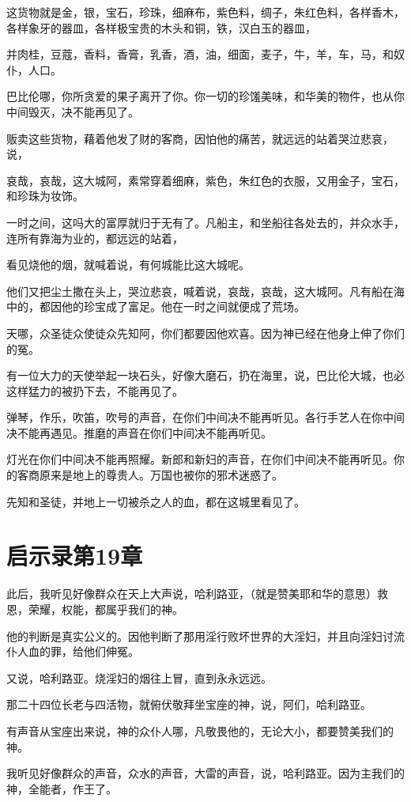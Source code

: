 \documentclass[12pt,oneside]{book}
\begin{document}
这货物就是金，银，宝石，珍珠，细麻布，紫色料，绸子，朱红色料，各样香木，各样象牙的器皿，各样极宝贵的木头和铜，铁，汉白玉的器皿，

并肉桂，豆蔻，香料，香膏，乳香，酒，油，细面，麦子，牛，羊，车，马，和奴仆，人口。

巴比伦哪，你所贪爱的果子离开了你。你一切的珍馐美味，和华美的物件，也从你中间毁灭，决不能再见了。

贩卖这些货物，藉着他发了财的客商，因怕他的痛苦，就远远的站着哭泣悲哀，说，

哀哉，哀哉，这大城阿，素常穿着细麻，紫色，朱红色的衣服，又用金子，宝石，和珍珠为妆饰。

一时之间，这吗大的富厚就归于无有了。凡船主，和坐船往各处去的，并众水手，连所有靠海为业的，都远远的站着，

看见烧他的烟，就喊着说，有何城能比这大城呢。

他们又把尘土撒在头上，哭泣悲哀，喊着说，哀哉，哀哉，这大城阿。凡有船在海中的，都因他的珍宝成了富足。他在一时之间就便成了荒场。

天哪，众圣徒众使徒众先知阿，你们都要因他欢喜。因为神已经在他身上伸了你们的冤。

有一位大力的天使举起一块石头，好像大磨石，扔在海里，说，巴比伦大城，也必这样猛力的被扔下去，不能再见了。

弹琴，作乐，吹笛，吹号的声音，在你们中间决不能再听见。各行手艺人在你中间决不能再遇见。推磨的声音在你们中间决不能再听见。

灯光在你们中间决不能再照耀。新郎和新妇的声音，在你们中间决不能再听见。你的客商原来是地上的尊贵人。万国也被你的邪术迷惑了。

先知和圣徒，并地上一切被杀之人的血，都在这城里看见了。

\chapter{启示录第19章}
此后，我听见好像群众在天上大声说，哈利路亚，（就是赞美耶和华的意思）救恩，荣耀，权能，都属乎我们的神。

他的判断是真实公义的。因他判断了那用淫行败坏世界的大淫妇，并且向淫妇讨流仆人血的罪，给他们伸冤。

又说，哈利路亚。烧淫妇的烟往上冒，直到永永远远。

那二十四位长老与四活物，就俯伏敬拜坐宝座的神，说，阿们，哈利路亚。

有声音从宝座出来说，神的众仆人哪，凡敬畏他的，无论大小，都要赞美我们的神。

我听见好像群众的声音，众水的声音，大雷的声音，说，哈利路亚。因为主我们的神，全能者，作王了。
\end{document}
